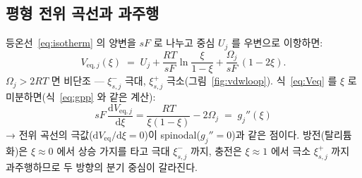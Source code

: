 \documentclass[11pt,a4paper]{article}
\newcommand{\dd}{\mathrm{d}}
\newcommand{\eq}{\mathrm{eq}}
\begin{document}
\subsection{평형 전위 곡선과 과주행}
등온선~\eqref{eq:isotherm} 의 양변을 $sF$ 로 나누고 중심 $U_j$ 를 우변으로 이항하면:
\begin{equation}
V_{\eq,j}(\xi)\;=\;U_j+\frac{RT}{sF}\ln\frac{\xi}{1-\xi}+\frac{\Omega_j}{sF}\,(1-2\xi).
\label{eq:Veq}
\end{equation}
$\Omega_j>2RT$ 면 비단조 — $\xi_{s,j}^-$ 극대, $\xi_{s,j}^+$ 극소(그림~\ref{fig:vdwloop}). 식~\eqref{eq:Veq} 를 $\xi$ 로 미분하면(식~\eqref{eq:gpp} 와 같은 계산):
\begin{equation}
sF\,\frac{\dd V_{\eq,j}}{\dd\xi}
=\frac{RT}{\xi(1-\xi)}-2\Omega_j
\;=\;g_j''(\xi)
\label{eq:veqslope}
\end{equation}
→ 전위 곡선의 극값($\dd V_{\eq}/\dd\xi=0$)이 spinodal($g_j''=0$)과 같은 점이다. 방전(탈리튬화)은 $\xi\approx0$ 에서 상승 가지를 타고 극대 $\xi_{s,j}^-$ 까지, 충전은 $\xi\approx1$ 에서 극소 $\xi_{s,j}^+$ 까지 과주행하므로 두 방향의 분기 중심이 갈라진다.
\end{document}
